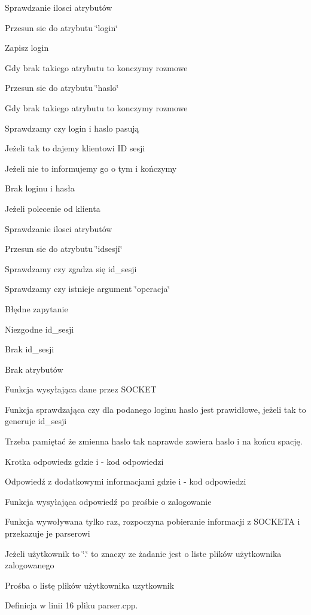Sprawdzanie ilosci atrybutów

Przesun sie do atrybutu \char`\"{}login\char`\"{}

Zapisz login

Gdy brak takiego atrybutu to konczymy rozmowe

Przesun sie do atrybutu \char`\"{}haslo\char`\"{}

Gdy brak takiego atrybutu to konczymy rozmowe

Sprawdzamy czy login i haslo pasują

Jeżeli tak to dajemy klientowi ID sesji

Jeżeli nie to informujemy go o tym i kończymy

Brak loginu i hasła

Jeżeli polecenie od klienta

Sprawdzanie ilosci atrybutów

Przesun sie do atrybutu \char`\"{}idsesji\char`\"{}

Sprawdzamy czy zgadza się id\_\-sesji

Sprawdzamy czy istnieje argument \char`\"{}operacja\char`\"{}

Błędne zapytanie

Niezgodne id\_\-sesji

Brak id\_\-sesji

Brak atrybutów

Funkcja wysyłająca dane przez SOCKET

Funkcja sprawdzająca czy dla podanego loginu hasło jest prawidłowe, jeżeli tak to generuje id\_\-sesji

Trzeba pamiętać że zmienna haslo tak naprawde zawiera haslo i na końcu spację.

Krotka odpowiedz gdzie i - kod odpowiedzi

Odpowiedź z dodatkowymi informacjami gdzie i - kod odpowiedzi

Funkcja wysyłająca odpowiedź po prośbie o zalogowanie

Funkcja wywoływana tylko raz, rozpoczyna pobieranie informacji z SOCKETA i przekazuje je parserowi

Jeżeli użytkownik to \char`\"{}.\char`\"{} to znaczy ze żadanie jest o liste plików użytkownika zalogowanego

Prośba o listę plików użytkownika uzytkownik 

Definicja w linii 16 pliku parser.cpp.

